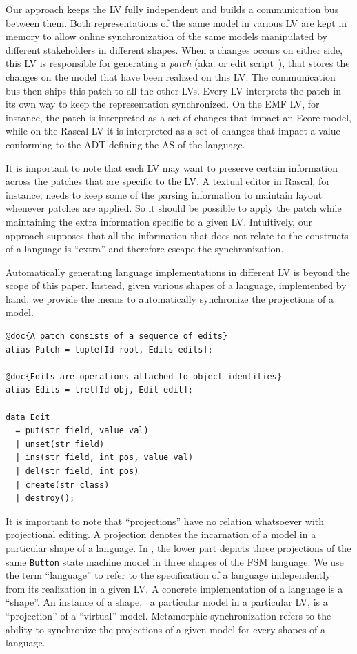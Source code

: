 Our approach keeps the LV fully independent and builds a communication bus between them.
Both representations of the same model in various LV are kept in memory to allow online synchronization of the same models manipulated by different stakeholders in different shapes.
When a changes occurs on either side, this LV is responsible for generating a \emph{patch} (aka. \de or edit script~\cite{rozen2017towards}), that stores the changes on the model that have been realized on this LV.
The communication bus then ships this patch to all the other LVs.
Every LV interprets the patch in its own way to keep the representation synchronized.
On the EMF LV, for instance, the patch is interpreted as a set of changes that impact an Ecore model, while on the Rascal LV it is interpreted as a set of changes that impact a value conforming to the ADT defining the AS of the language.

It is important to note that each LV may want to preserve certain information across the patches that are specific to the LV.
A textual editor in Rascal, for instance, needs to keep some of the parsing information to maintain layout whenever patches are applied.
So it should be possible to apply the patch while maintaining the extra information specific to a given LV.
Intuitively, our approach supposes that all the information that does not relate to the constructs of a language is ``extra'' and therefore escape the synchronization. 

Automatically generating language implementations in different LV is beyond the scope of this paper.
Instead, given various shapes of a language, implemented by hand, we provide the means to automatically synchronize the projections of a model.


\begin{lstlisting}[label=lst:delta-adt, caption={CRUD-like patch definition in Rascal}, language=Rascal, float=tb]
@doc{A patch consists of a sequence of edits}
alias Patch = tuple[Id root, Edits edits];

@doc{Edits are operations attached to object identities}
alias Edits = lrel[Id obj, Edit edit];

data Edit
  = put(str field, value val)
  | unset(str field)
  | ins(str field, int pos, value val)
  | del(str field, int pos)
  | create(str class) 
  | destroy();
\end{lstlisting}

It is important to note that ``projections'' have no relation whatsoever with projectional editing.
A projection denotes the incarnation of a model in a particular shape of a language.
In , the lower part depicts three projections of the same \texttt{Button} state machine model in three shapes of the FSM language.
We use the term ``language'' to refer to the specification of a language independently from its realization in a given LV.
A concrete implementation of a language is a ``shape''.
An instance of a shape, \ie~a particular model in a particular LV, is a ``projection'' of a ``virtual'' model.
Metamorphic synchronization refers to the ability to synchronize the projections of a given model for every shapes of a language.
